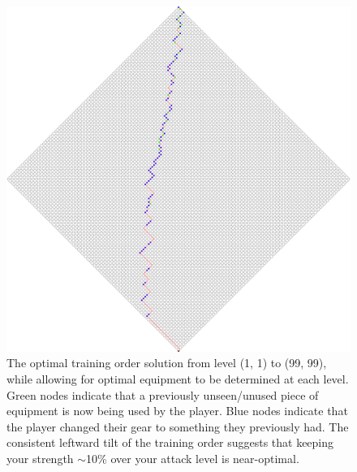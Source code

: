	\begin{figure}
		\centering
		\includegraphics[width=\linewidth]{img/combat/defence_training.png}
		\caption{
			The optimal training order solution from level (1, 1) to (99, 99), while allowing for optimal equipment to be determined at each level. Green nodes indicate that a previously unseen/unused piece of equipment is now being used by the player. Blue nodes indicate that the player changed their gear to something they previously had. The consistent leftward tilt of the training order suggests that keeping your strength $\sim$10\% over your attack level is near-optimal.
		}
		\label{fig:defence_training}
	\end{figure}